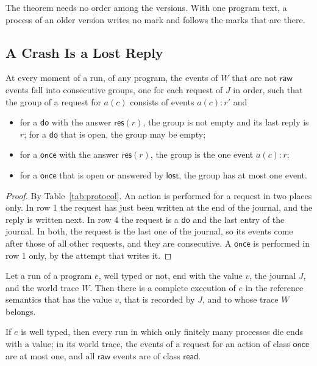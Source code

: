 \documentclass[acmsmall,nonacm,screen]{acmart}
\newcommand{\kw}[1]{\mathsf{#1}}
\newcommand{\res}[1]{\kw{res}(#1)}
\newcommand{\lost}{\kw{lost}}
\newcommand{\rd}{\kw{read}}
\newcommand{\onceclass}{\kw{once}}
\begin{document}
The theorem needs no order among the versions. With one program text, a process of an older
version writes no mark and follows the marks that are there.

\subsection{A Crash Is a Lost Reply}

\begin{lemma}
\label{lem:counts}
At every moment of a run, of any program, the events of $W$ that are not $\kw{raw}$ events
fall into consecutive groups, one for each request of $J$ in order, such that the group of a
request for $a(c)$ consists of events $a(c){:}r'$ and
\begin{itemize}
\item for a $\kw{do}$ with the answer $\res{r}$, the group is not empty and its last reply is
  $r$; for a $\kw{do}$ that is open, the group may be empty;
\item for a $\kw{once}$ with the answer $\res{r}$, the group is the one event $a(c){:}r$;
\item for a $\kw{once}$ that is open or answered by $\lost$, the group has at most one event.
\end{itemize}
\end{lemma}

\begin{proof}
By Table~\ref{tab:protocol}. An action is performed for a request in two places only. In row
1 the request has just been written at the end of the journal, and the reply is written next.
In row 4 the request is a $\kw{do}$ and the last entry of the journal. In both, the request is
the last one of the journal, so its events come after those of all other requests, and they
are consecutive. A $\kw{once}$ is performed in row 1 only, by the attempt that writes it.
\end{proof}

\begin{theorem}
\label{thm:sound}
Let a run of a program $e$, well typed or not, end with the value $v$, the journal $J$, and
the world trace $W$. Then there is a complete execution of $e$ in the reference semantics
that has the value $v$, that is recorded by $J$, and to whose trace $W$ belongs.

If $e$ is well typed, then every run in which only finitely many processes die ends with a
value; in its world trace, the events of a request for an action of class $\onceclass$ are at
most one, and all $\kw{raw}$ events are of class $\rd$.
\end{theorem}
\end{document}
